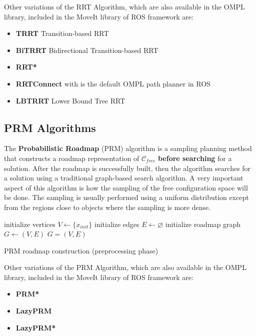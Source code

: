 Other variations of the RRT Algorithm, which are also available in the OMPL library, included in the MoveIt library of ROS framework  are:
\begin{itemize}
	\item \textbf{TRRT} Transition-based RRT
	\item \textbf{BiTRRT} Bidirectional Transition-based RRT
	\item \textbf{RRT*}
	\item \textbf{RRTConnect} with is the default OMPL path planner in ROS
	\item \textbf{LBTRRT} Lower Bound Tree RRT
\end{itemize}


\subsection{PRM Algorithms}

The \textbf{Probabilistic Roadmap} (PRM) algorithm is a sampling planning method that constructs a roadmap representation of $\mathcal{C}_{free}$ \textbf{before searching} for a solution. After the roadmap is successfully built, then the algorithm searches 
for a solution using a traditional graph-based search algorithm. A very important aspect of this algorithm is how the sampling of the free configuration space will be done. The sampling is usually performed using a 
uniform distribution except from the regions close to objects where the sampling is more dense.

\begin{algorithm}[H]
\SetAlgoLined
initialize vertices $V \leftarrow \lbrace x_{init} \rbrace$\;
initialize edges $E \leftarrow \varnothing$\;
initialize roadmap graph $G \leftarrow (V,E)$\;
\Return $G=(V,E)$
\caption{PRM roadmap construction (preprocessing phase)}
\end{algorithm}

Other variations of the PRM Algorithm, which are also available in the OMPL library, included in the MoveIt library of ROS framework  are:
\begin{itemize}
	\item \textbf{PRM*}
	\item \textbf{LazyPRM}
	\item \textbf{LazyPRM*}
\end{itemize}


